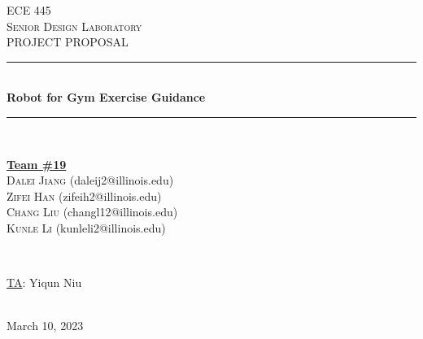 \documentclass[12pt]{article}
\begin{document}
\begin{titlepage}
\newcommand{\HRule}{\rule{\linewidth}{0.1mm}} 
\center %
 
\textsc{\Large ECE 445}\\[0.5cm] %
\textsc{\large Senior Design Laboratory}\\[0.5cm] %
\textsc{\Large PROJECT PROPOSAL }\\[0.5cm] %

\HRule \\[0.5cm]
\huge \textbf{Robot for Gym Exercise Guidance} %
\HRule \\[2cm]
 
\begin{minipage}{0.5\textwidth}
    \begin{center} \large
        \underline{\textbf{Team \#19}} \\ \medskip
        \textsc{Dalei Jiang} (daleij2@illinois.edu) \\
        \textsc{Zifei Han} (zifeih2@illinois.edu) \\
        \textsc{Chang Liu} (changl12@illinois.edu) \\
        \textsc{Kunle Li} (kunleli2@illinois.edu) \\
    \end{center}
\end{minipage} \\[1.5cm]

\begin{minipage}{0.5\textwidth}
    \begin{center}
        \large
        \underline{TA}: Yiqun Niu
    \end{center}
\end{minipage} \\[1cm]

{\large March 10, 2023} %

\vfill %

\end{titlepage}
\clearpage
\tableofcontents
\newpage
\end{document}
